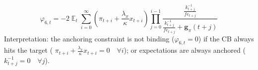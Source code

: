 \documentclass[11pt]{article}
\renewcommand{\[}{\begin{equation}}
\renewcommand{\]}{\end{equation}}
\DeclareMathOperator{\E}{\mathbb{E}}
\begin{document}
\begin{equation}
\varphi_{6,t} = -2\E_t\sum_{i=0}^{\infty}(\pi_{t+i}+\frac{\lambda_x}{\kappa}x_{t+i})\prod_{j=0}^{i-1}\frac{\frac{k_{t+j}^{-1}}{fe_{t+j}}}{\frac{k_{t+j}^{-1}}{fe_{t+j}} + \mathbf{g}_{\pi}(t+j)} \label{sol1'}
\end{equation}
Interpretation: the anchoring constraint is not binding ($\varphi_{6,t}=0$) if the CB always hits the target (
$\pi_{t+i}+\frac{\lambda_x}{\kappa}x_{t+i} = 0 \quad \forall i$); or expectations are always anchored ($k_{t+j}^{-1}=0 \quad \forall j$). 
\end{document}

